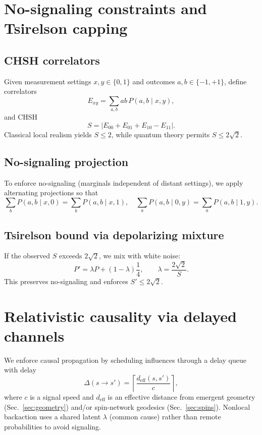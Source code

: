 \documentclass[11pt]{article}
\begin{document}
\section{No-signaling constraints and Tsirelson capping}
\subsection{CHSH correlators}
Given measurement settings $x,y\in\{0,1\}$ and outcomes $a,b\in\{-1,+1\}$, define correlators
\begin{equation}
E_{xy} = \sum_{a,b} ab\, P(a,b\mid x,y),
\end{equation}
and CHSH
\begin{equation}
S = \left|E_{00}+E_{01}+E_{10}-E_{11}\right|.
\end{equation}
Classical local realism yields $S\le 2$, while quantum theory permits $S\le 2\sqrt{2}$.

\subsection{No-signaling projection}
To enforce no-signaling (marginals independent of distant settings), we apply alternating projections so that
\begin{equation}
\sum_b P(a,b\mid x,0)=\sum_b P(a,b\mid x,1),\quad
\sum_a P(a,b\mid 0,y)=\sum_a P(a,b\mid 1,y).
\end{equation}

\subsection{Tsirelson bound via depolarizing mixture}
If the observed $S$ exceeds $2\sqrt2$, we mix with white noise:
\begin{equation}
P' = \lambda P + (1-\lambda)\frac{1}{4},\qquad \lambda = \frac{2\sqrt2}{S}.
\end{equation}
This preserves no-signaling and enforces $S'\le 2\sqrt2$.

\section{Relativistic causality via delayed channels}
We enforce causal propagation by scheduling influences through a delay queue with delay
\begin{equation}
\Delta(s\to s') = \left\lceil \frac{d_{\mathrm{eff}}(s,s')}{c}\right\rceil,
\end{equation}
where $c$ is a signal speed and $d_{\mathrm{eff}}$ is an effective distance from emergent geometry (Sec.~\ref{sec:geometry}) and/or spin-network geodesics (Sec.~\ref{sec:spins}). Nonlocal backaction uses a shared latent $\lambda$ (common cause) rather than remote probabilities to avoid signaling.
\end{document}

